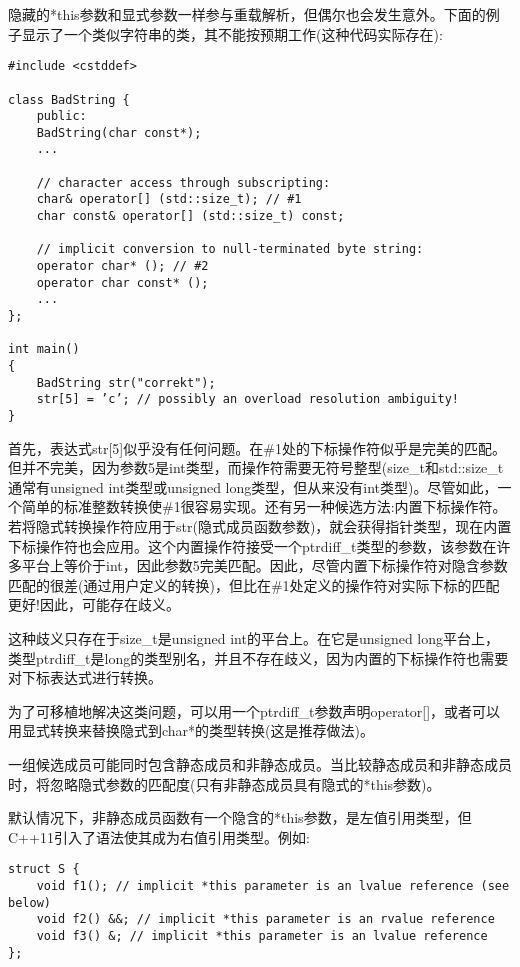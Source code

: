 隐藏的*this参数和显式参数一样参与重载解析，但偶尔也会发生意外。下面的例子显示了一个类似字符串的类，其不能按预期工作(这种代码实际存在):

\begin{lstlisting}[style=styleCXX]
#include <cstddef>

class BadString {
	public:
	BadString(char const*);
	...
	
	// character access through subscripting:
	char& operator[] (std::size_t); // #1
	char const& operator[] (std::size_t) const;
	
	// implicit conversion to null-terminated byte string:
	operator char* (); // #2
	operator char const* ();
	...
};

int main()
{
	BadString str("correkt");
	str[5] = ’c’; // possibly an overload resolution ambiguity!
}
\end{lstlisting}

首先，表达式str[5]似乎没有任何问题。在\#1处的下标操作符似乎是完美的匹配。但并不完美，因为参数5是int类型，而操作符需要无符号整型(size\_t和std::size\_t通常有unsigned int类型或unsigned long类型，但从来没有int类型)。尽管如此，一个简单的标准整数转换使\#1很容易实现。还有另一种候选方法:内置下标操作符。若将隐式转换操作符应用于str(隐式成员函数参数)，就会获得指针类型，现在内置下标操作符也会应用。这个内置操作符接受一个ptrdiff\_t类型的参数，该参数在许多平台上等价于int，因此参数5完美匹配。因此，尽管内置下标操作符对隐含参数匹配的很差(通过用户定义的转换)，但比在\#1处定义的操作符对实际下标的匹配更好!因此，可能存在歧义。

\begin{tcolorbox}[colback=webgreen!5!white,colframe=webgreen!75!black]
\hspace*{0.75cm}这种歧义只存在于size\_t是unsigned int的平台上。在它是unsigned long平台上，类型ptrdiff\_t是long的类型别名，并且不存在歧义，因为内置的下标操作符也需要对下标表达式进行转换。
\end{tcolorbox}

为了可移植地解决这类问题，可以用一个ptrdiff\_t参数声明operator[]，或者可以用显式转换来替换隐式到char*的类型转换(这是推荐做法)。

一组候选成员可能同时包含静态成员和非静态成员。当比较静态成员和非静态成员时，将忽略隐式参数的匹配度(只有非静态成员具有隐式的*this参数)。

默认情况下，非静态成员函数有一个隐含的*this参数，是左值引用类型，但C++11引入了语法使其成为右值引用类型。例如:

\begin{lstlisting}[style=styleCXX]
struct S {
	void f1(); // implicit *this parameter is an lvalue reference (see below)
	void f2() &&; // implicit *this parameter is an rvalue reference
	void f3() &; // implicit *this parameter is an lvalue reference
};
\end{lstlisting}

